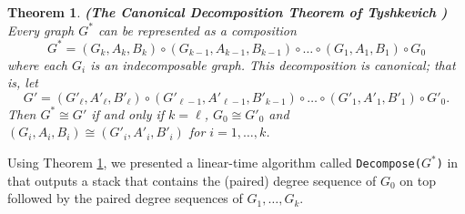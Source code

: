 \documentclass[11pt]{article}
\newtheorem{theorem}[df]{Theorem}
\begin{document}
\begin{theorem} {\bf (The Canonical Decomposition Theorem of Tyshkevich \cite{Ty00})}
Every graph $G^*$ can be represented as a composition 
$$ G^*= (G_k , A_k, B_k) \circ (G_{k-1}, A_{k-1}, B_{k-1})  \circ \hdots \circ (G_1, A_1, B_1) \circ G_0$$
where each $G_i$ is an indecomposable graph.  This decomposition is canonical; that is, let
$$G' = (G'_\ell, A'_\ell, B'_\ell) \circ (G'_{\ell-1}, A'_{\ell-1}, B'_{k-1}) \circ \hdots \circ (G'_1, A'_1, B'_1) \circ G'_0.$$
Then $G^* \cong G'$ if and only if $k = \ell$, $G_0 \cong G'_0$ and $(G_i, A_i, B_i) \cong (G'_i, A'_i, B'_i)$ for $i = 1, \hdots, k$. 
\label{mainthm2}
\end{theorem}

Using Theorem \ref{mainthm2}, we presented a linear-time algorithm called {\tt Decompose($G^*$)} in \cite{Ch25} that outputs a stack that contains the (paired) degree sequence of $G_0$ on top followed by the paired degree sequences of  $G_1, \hdots, G_k$.  
\end{document}

